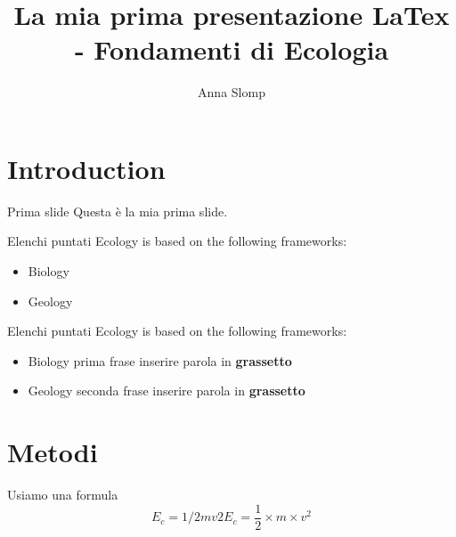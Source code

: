 \documentclass{beamer}  #BEAMER è un pezzo di softuer che serve proprio per costruire delle presentazioni
\title{La mia prima presentazione LaTex 
- Fondamenti di Ecologia}
\author{Anna Slomp}
\begin{document}
\maketitle

\section{Introduction}
\begin{frame}{Prima slide} %
Questa è la mia prima slide.  %
\end{frame} %

\begin{frame}{Elenchi puntati}
Ecology is based on the following frameworks:
\begin{itemize}
    \item Biology
    \item Geology
\end{itemize}    
\end{frame}

\begin{frame}{Elenchi puntati}
Ecology is based on the following frameworks:
\begin{itemize}
    \item Biology prima frase inserire parola in \textbf{grassetto}
    \item \pause Geology seconda frase inserire parola in \textbf{grassetto}
\end{itemize}    
\end{frame}

\section{Metodi}
\begin{frame}{Usiamo una formula} %
\begin{equation}
    E_c = 1/2 mv2 
E_c = \frac{1}{2} \times m \times v^2
\end{equation}
\label{eq.cinetic} %
\end{frame}
\end{document}
